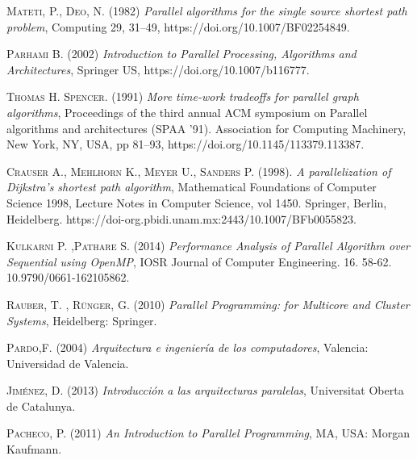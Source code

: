 \documentclass[11pt]{article}
\begin{document}
\begin{thebibliography}{x}
  \textsc{Mateti, P., Deo, N. (1982)} 
 	\textit{Parallel algorithms for the single source shortest path problem}, Computing 29, 31–49, https://doi.org/10.1007/BF02254849.

  \textsc{Parhami B. (2002)} 
 	\textit{Introduction to Parallel Processing, Algorithms and Architectures}, Springer US, https://doi.org/10.1007/b116777.

  \textsc{Thomas H. Spencer. (1991)} 
 	\textit{More time-work tradeoffs for parallel graph algorithms}, Proceedings of the third annual ACM symposium on Parallel algorithms and architectures (SPAA '91). Association for Computing Machinery, New York, NY, USA, pp 81–93, https://doi.org/10.1145/113379.113387.

  \textsc{Crauser A., Mehlhorn K., Meyer U., Sanders P. (1998).} 
 	\textit{ A parallelization of Dijkstra's shortest path algorithm}, Mathematical Foundations of Computer Science 1998, Lecture Notes in Computer Science, vol 1450. Springer, Berlin, Heidelberg. https://doi-org.pbidi.unam.mx:2443/10.1007/BFb0055823.

  \textsc{Kulkarni P. ,Pathare S.  (2014)} 
 	\textit{Performance Analysis of Parallel Algorithm over Sequential using OpenMP}, IOSR Journal of Computer Engineering. 16. 58-62. 10.9790/0661-162105862. 
 	
 \textsc{Rauber, T. , Rünger, G. (2010)}
	\textit{Parallel Programming: for Multicore and Cluster Systems},  Heidelberg: Springer.
	
\textsc{Pardo,F. (2004)}
	\textit{Arquitectura e ingeniería de los computadores},  Valencia: Universidad de Valencia.

\textsc{Jiménez, D. (2013)}
	\textit{Introducción a las arquitecturas paralelas},  Universitat Oberta de Catalunya.
	
\textsc{Pacheco, P. (2011)}
	\textit{An Introduction to Parallel Programming},  MA, USA: Morgan Kaufmann.

\end{thebibliography}
\end{document}

